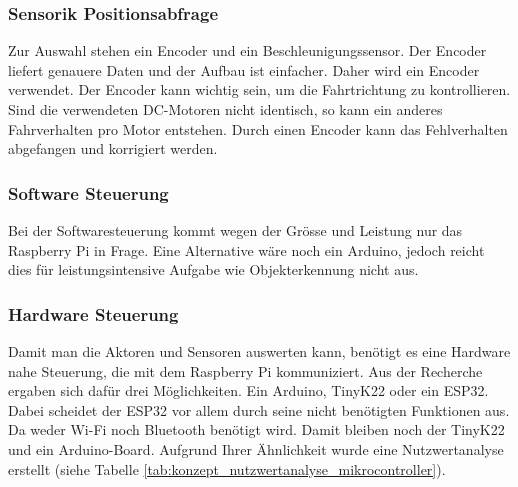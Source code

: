 \documentclass[../main.tex]{subfiles}
\begin{document}
\subsubsection{Sensorik Positionsabfrage}
\label{a3:Sensorik:Positionsabfrage}
Zur Auswahl stehen ein Encoder und ein Beschleunigungssensor. Der Encoder liefert genauere Daten und der Aufbau ist einfacher. Daher wird ein Encoder verwendet. Der Encoder kann wichtig sein, um die Fahrtrichtung zu kontrollieren. Sind die verwendeten DC-Motoren nicht identisch, so kann ein anderes Fahrverhalten pro Motor entstehen. Durch einen Encoder kann das Fehlverhalten abgefangen und korrigiert werden.

\subsubsection{Software Steuerung}
Bei der Softwaresteuerung kommt wegen der Grösse und Leistung nur das Raspberry Pi in Frage.
Eine Alternative wäre noch ein Arduino, jedoch reicht dies für leistungsintensive Aufgabe wie
Objekterkennung nicht aus.

\newpage

\subsubsection{Hardware Steuerung}
\label{a3:Hardware Steuerung}
Damit man die Aktoren und Sensoren auswerten kann, benötigt es eine Hardware nahe Steuerung, die mit dem Raspberry Pi kommuniziert. Aus der Recherche ergaben sich dafür drei Möglichkeiten. Ein Arduino, TinyK22 oder ein ESP32. Dabei scheidet der ESP32 vor allem durch seine nicht benötigten Funktionen aus. Da weder Wi-Fi noch Bluetooth benötigt wird. Damit bleiben noch der TinyK22 und ein Arduino-Board. Aufgrund Ihrer Ähnlichkeit wurde eine Nutzwertanalyse erstellt (siehe Tabelle \ref{tab:konzept_nutzwertanalyse_mikrocontroller}).
\end{document}
